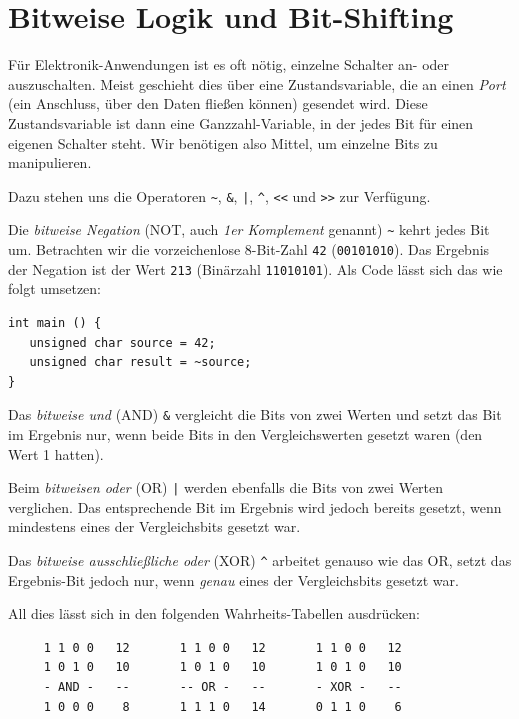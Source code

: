 \section{Bitweise Logik und Bit-Shifting} \label{sec:BitwiseOperator}
Für Elektronik-Anwendungen ist es oft nötig, einzelne Schalter an- oder auszuschalten. Meist geschieht dies über eine Zustandsvariable, die an einen \emph{Port} (ein Anschluss, über den Daten fließen können) gesendet wird. Diese Zustandsvariable ist dann \idR eine Ganzzahl-Variable, in der jedes Bit für einen eigenen Schalter steht. Wir benötigen also Mittel, um einzelne Bits zu manipulieren.

Dazu stehen uns die Operatoren \texttt{\~}, \texttt{\&}, \texttt{|}, \texttt{\^}, \texttt{<{}<} und \texttt{>{}>} zur Verfügung.

Die \emph{bitweise Negation} (NOT, auch \emph{1er Komplement} genannt) \texttt{\~} kehrt jedes Bit um. Betrachten wir die vorzeichenlose 8-Bit-Zahl \texttt{42} (\texttt{00101010}). Das Ergebnis der Negation ist der Wert \texttt{213} (Binärzahl \texttt{11010101}). Als Code lässt sich das wie folgt umsetzen:
\begin{codebox}
\begin{verbatim}
int main () {
   unsigned char source = 42;
   unsigned char result = ~source;
}
\end{verbatim}
\end{codebox}

Das \emph{bitweise und} (AND) \texttt{\&} vergleicht die Bits von zwei Werten und setzt das Bit im Ergebnis nur, wenn beide Bits in den Vergleichswerten gesetzt waren (\ie den Wert 1 hatten).

Beim \emph{bitweisen oder} (OR) \texttt{|} werden ebenfalls die Bits von zwei Werten verglichen. Das entsprechende Bit im Ergebnis wird jedoch bereits gesetzt, wenn mindestens eines der Vergleichsbits gesetzt war.

Das \emph{bitweise ausschließliche oder} (XOR) \texttt{\^} arbeitet genauso wie das OR, setzt das Ergebnis-Bit jedoch nur, wenn \emph{genau} eines der Vergleichsbits gesetzt war.

All dies lässt sich in den folgenden Wahrheits-Tabellen ausdrücken:
\begin{codebox}
\begin{verbatim}
     1 1 0 0   12       1 1 0 0   12       1 1 0 0   12
     1 0 1 0   10       1 0 1 0   10       1 0 1 0   10
     - AND -   --       -- OR -   --       - XOR -   --
     1 0 0 0    8       1 1 1 0   14       0 1 1 0    6
\end{verbatim}
\end{codebox}

